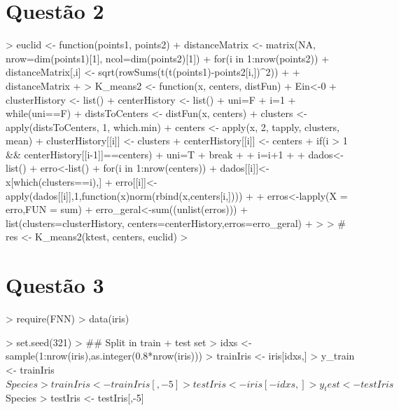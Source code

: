\documentclass{article}
\begin{document}
\section*{Questão 2}

\begin{Schunk}
\begin{Sinput}
> euclid <- function(points1, points2) {
+   distanceMatrix <- matrix(NA, nrow=dim(points1)[1], ncol=dim(points2)[1])
+   for(i in 1:nrow(points2)) {
+     distanceMatrix[,i] <- sqrt(rowSums(t(t(points1)-points2[i,])^2))
+   }
+   distanceMatrix
+ }
> K_means2 <- function(x, centers, distFun) {
+   Ein<-0
+   clusterHistory <- list()
+   centerHistory <- list()
+   uni=F
+   i=1
+   while(uni==F){
+     distsToCenters <- distFun(x, centers)
+     clusters <- apply(distsToCenters, 1, which.min)
+     centers <- apply(x, 2, tapply, clusters, mean)
+     clusterHistory[[i]] <- clusters
+     centerHistory[[i]] <- centers
+     if(i > 1 && centerHistory[[i-1]]==centers){
+       uni=T
+       break
+     }
+     i=i+1
+   }
+   dados<-list()
+   erro<-list()
+   for(i in 1:nrow(centers)){
+     dados[[i]]<-x[which(clusters==i),]
+     erro[[i]]<-apply(dados[[i]],1,function(x)norm(rbind(x,centers[i,])))
+   }
+   erros<-lapply(X = erro,FUN = sum)
+   erro_geral<-sum((unlist(erros)))
+   list(clusters=clusterHistory, centers=centerHistory,erros=erro_geral)
+ }
> 
> # res <- K_means2(ktest, centers, euclid)
> 
\end{Sinput}
\end{Schunk}




\section*{Questão 3}
\begin{Schunk}
\begin{Sinput}
> require(FNN)
> data(iris)
\end{Sinput}
\end{Schunk}

\begin{Schunk}
\begin{Sinput}
> set.seed(321)
> ## Split in train + test set
> idxs <- sample(1:nrow(iris),as.integer(0.8*nrow(iris)))
> trainIris <- iris[idxs,]
> y_train <- trainIris$Species
> trainIris <- trainIris[,-5]
> testIris <- iris[-idxs,]
> y_test <- testIris$Species
> testIris <- testIris[,-5]
\end{Sinput}
\end{Schunk}
\end{document}
